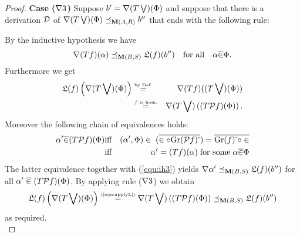 \documentclass{book}
\begin{document}
\begin{proof}
   {\bf Case ($\xxvinb 3$)} Suppose $b' = \xxvinb (\xxviF \xxvibv)(\Phi)$ and suppose
   that there is a derivation $\xxviD$ of $\xxvinb (\xxviF \xxvibv)(\Phi)
   \xxviissm_{\xxvinax(A,R)} b''$ that ends with the following rule:
	\begin{prooftree}
	\end{prooftree}
        By the inductive hypothesis we have 
	\begin{equation}\label{equ:ih3}
	   \xxvinb (\xxviF f)(\alpha) \xxviissm_{\xxvinax(B,S)} \xxviLift(f)(b'') \quad
\mbox{for all} \quad  \alpha \xxviol{\in} \Phi. 
	\end{equation}
	Furthermore we get
	\begin{eqnarray}
	   \xxviLift(f)\left( \xxvinb (\xxviF \xxvibv) (\Phi) \right) &
\stackrel{\mbox{\tiny by Def.}}{=} & \xxvinb (\xxviF f) ((\xxviF \xxvibv) (\Phi)) \\	
	   & \stackrel{\mbox{\tiny $f$ is hom.}}{=} & \xxvinb (\xxviF \xxvibv) \left(
(\xxviF \xxviPw f)(\Phi)\right).\label{equ:applyL}
	\end{eqnarray}
        Moreover the following chain of equivalences holds:
	\begin{eqnarray*}
	   \alpha' \xxviol{\in} (\xxviF \xxviPw f)(\Phi) & \mbox{iff} & (\alpha',\Phi)
\in \; (\xxviol{\in \circ \xxviconv{\xxviGraph(\xxviPw f)}})
	    = \xxviol{\xxviconv{\xxviGraph(f)} \circ \in}  \\
	    & \mbox{iff} & \alpha' = (\xxviF f)(\alpha) \; \mbox{for some} \;
\alpha \xxviol{\in} \Phi  
	\end{eqnarray*}
	The latter equivalence together with (\ref{equ:ih3}) yields 
	$ \xxvinb \alpha' \xxviissm_{\xxvinax(B,S)} \xxviLift(f)(b'') $ for all $\alpha'
\;\xxviol{\in}\; (\xxviF \xxviPw f)(\Phi)$.
By applying rule ($\xxvinb 3$) we obtain 
\[ 
\xxviLift(f)\left( \xxvinb (\xxviF \xxvibv) (\Phi) \right) 
  \stackrel{\mbox{\tiny (\ref{equ:applyL})}}{=}
  \xxvinb (\xxviF \xxvibv)  \left( (\xxviF \xxviPw f)(\Phi)\right) \xxviissm_{\xxvinax(B,S)} \xxviLift(f)(b'')
\]
as required.\\


\end{proof}
\end{document}
